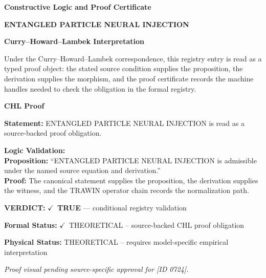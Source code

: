 \clearpage
\begingroup\tzpsupportsetup
\noindent\textbf{\fontsize{10.8pt}{12.8pt}\selectfont [ID 0724] Constructive Logic and Proof Certificate}\par
\noindent\textbf{\fontsize{10pt}{12pt}\selectfont ENTANGLED PARTICLE NEURAL INJECTION}\par
\vspace{0.45em}
\begingroup
\footnotesize
\setlength{\parskip}{0.22em}
\setlength{\parindent}{0pt}
\noindent\textbf{Curry--Howard--Lambek Interpretation}\par
Under the Curry--Howard--Lambek correspondence, this registry entry is read as a typed proof
object: the stated source condition supplies the proposition, the derivation supplies the
morphism, and the proof certificate records the machine handles needed to check the obligation
in the formal registry.

\vspace{0.45em}
\noindent\textbf{CHL Proof}\par
\textbf{Statement:} ENTANGLED PARTICLE NEURAL INJECTION is read as a source-backed proof obligation.

\textbf{Logic Validation:}\\
\textbf{Proposition:} ``ENTANGLED PARTICLE NEURAL INJECTION is admissible under the named source equation and derivation.''\\
\textbf{Proof:} The canonical statement supplies the proposition, the derivation supplies the witness, and the TRAWIN operator chain records the normalization path.

\textbf{VERDICT:} \ensuremath{\checkmark}\ \textbf{TRUE} --- conditional registry validation

\textbf{Formal Status:} \ensuremath{\checkmark}\ THEORETICAL -- source-backed CHL proof obligation

\textbf{Physical Status:} THEORETICAL -- requires model-specific empirical interpretation
\par\vspace{0.45em}
\par
\vfill
\begingroup\footnotesize\itshape
Proof visual pending source-specific approval for [ID 0724].
\par\endgroup
\vfill
\endgroup
\endgroup
